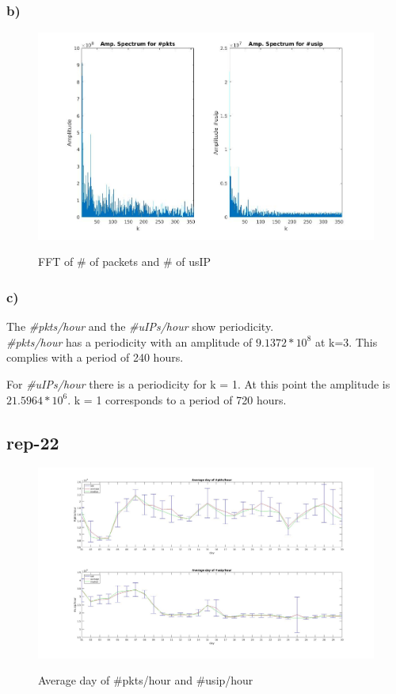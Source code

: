 \subsubsection*{b)}
\begin{figure}[H]
\center
\includegraphics[width=.7\textwidth]{./chapters/plots/rep21b.jpg}\\
\caption{ FFT of \# of packets and \# of usIP  }
\end{figure}

\subsubsection*{c)}
The \textit{\#pkts/hour} and the \textit{\#uIPs/hour} show periodicity.\\

\textit{\#pkts/hour} has a periodicity with an amplitude of $9.1372 * 10^8$ at k=3. This complies with a period of 240 hours. \\


For \textit{\#uIPs/hour} there is a periodicity for k = 1. At this point the amplitude is $21.5964 * 10^6$. k = 1 corresponds to a period of 720 hours.


\subsection*{rep-22}
\begin{figure}[H]
\center
\includegraphics[width=1\textwidth]{./chapters/plots/rep-22.jpg}\\
\caption{ Average day of \#pkts/hour and \#usip/hour }
\end{figure}

